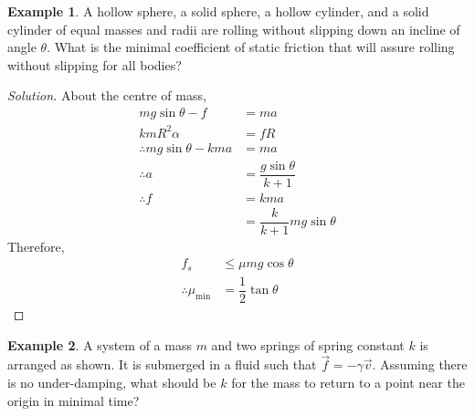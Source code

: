 \documentclass[fleqn, a4paper, 12pt]{article}
\theoremstyle{definition}
\newtheorem{example}{Example}
\theoremstyle{theorem}
\newenvironment{solution}
{\begin{proof}[Solution]\let\qed\relax}
	{\end{proof}}
\begin{document}
\begin{example}
	A hollow sphere, a solid sphere, a hollow cylinder, and a solid cylinder of equal masses and radii are rolling without slipping down an incline of angle $\theta$. What is the minimal coefficient of static friction that will assure rolling without slipping for all bodies?
\end{example}

\begin{solution}
	About the centre of mass,
	\begin{align*}
		m g \sin \theta - f &= m a\\
		k m R^2 \alpha &= f R\\
		\therefore m g \sin \theta - k m a &= m a\\
		\therefore a &= \dfrac{g \sin \theta}{k + 1}\\
		\therefore f &= k m a\\
		&= \dfrac{k}{k + 1} m g \sin \theta
	\end{align*}
	Therefore, 
	\begin{align*}
		f_s &\leq \mu m g \cos \theta\\
		\therefore \mu_{\text{min}} &= \dfrac{1}{2} \tan \theta
	\end{align*}
\end{solution}

\begin{example}
	A system of a mass $m$ and two springs of spring constant $k$ is arranged as shown. It is submerged in a fluid such that $\overrightarrow{f} = - \gamma \overrightarrow{v}$. Assuming there is no under-damping, what should be $k$ for the mass to return to a point near the origin in minimal time?\\
\end{example}
\end{document}
